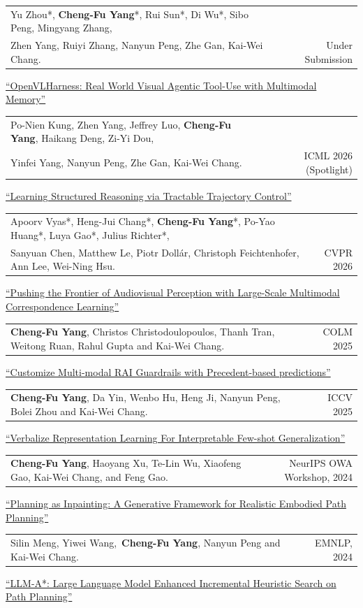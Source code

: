 \documentclass[letterpaper,11pt]{article}
\makeatletter
\newcommand{\resumePublicationHeading}[3]{
    \item
    \begin{tabular*}{0.97\textwidth}{l@{\extracolsep{\fill}}r}
      \small #1 & \small #2 \\
    \end{tabular*}\vspace{-7pt}

    \vspace{3pt}
    \small \hspace*{0.05in} #3
    \vspace{-4pt}
}
\makeatother
\begin{document}
      \resumePublicationHeading{Yu Zhou*, \textbf{Cheng-Fu Yang}*, Rui Sun*, Di Wu*, Sibo Peng, Mingyang Zhang, \\ Zhen Yang, Ruiyi Zhang, Nanyun Peng, Zhe Gan, Kai-Wei Chang.}{Under Submission}{\href{https://arxiv.org/abs/2610.26860}{``OpenVLHarness: Real World Visual Agentic Tool-Use with Multimodal Memory''}}

      \resumePublicationHeading{Po-Nien Kung, Zhen Yang, Jeffrey Luo, \textbf{Cheng-Fu Yang}, Haikang Deng, Zi-Yi Dou, \\
      \hspace*{0.05in} Yinfei Yang, Nanyun Peng, Zhe Gan, Kai-Wei Chang.}{ICML 2026 ({Spotlight})}{\href{https://proceedings.mlr.press/v306/kung26a.html}{``Learning Structured Reasoning via Tractable Trajectory Control''}}

     \resumePublicationHeading{Apoorv Vyas*, Heng-Jui Chang*, \textbf{Cheng-Fu Yang}*, Po-Yao Huang*, Luya Gao*, Julius Richter*, \\
      \hspace*{0.05in} Sanyuan Chen, Matthew Le, Piotr Dollár, Christoph Feichtenhofer, Ann Lee, Wei-Ning Hsu.}{CVPR 2026}{\href{https://openaccess.thecvf.com/content/CVPR2026/html/Vyas_Pushing_the_Frontier_of_Audiovisual_Perception_with_Large-Scale_Multimodal_Correspondence_CVPR_2026_paper.html}{``Pushing the Frontier of Audiovisual Perception with Large-Scale Multimodal Correspondence Learning''}}

     \resumePublicationHeading{\textbf{Cheng-Fu Yang}, Christos Christodoulopoulos, Thanh Tran, Weitong Ruan, Rahul Gupta and Kai-Wei Chang.}{COLM 2025}{\href{https://arxiv.org/abs/2507.20503}{``Customize Multi-modal RAI Guardrails with Precedent-based predictions''}}

     \resumePublicationHeading{\textbf{Cheng-Fu Yang}, Da Yin, Wenbo Hu, Heng Ji, Nanyun Peng, Bolei Zhou and Kai-Wei Chang. }{ICCV 2025}{\href{https://openaccess.thecvf.com/content/ICCV2025/papers/Yang_Verbalized_Representation_Learning_for_Interpretable_Few-Shot_Generalization_ICCV_2025_paper.pdf}{``Verbalize Representation Learning For Interpretable Few-shot Generalization''}}

      \resumePublicationHeading{\textbf{Cheng-Fu Yang}, Haoyang Xu, Te-Lin Wu, Xiaofeng Gao, Kai-Wei Chang, and Feng Gao. }{NeurIPS OWA Workshop, 2024}{\href{https://arxiv.org/abs/2312.01097}{``Planning as Inpainting: A Generative Framework for Realistic Embodied Path Planning''}}

      \resumePublicationHeading{Silin Meng, Yiwei Wang,~\textbf{Cheng-Fu Yang}, Nanyun Peng and Kai-Wei Chang.}{EMNLP, 2024}{\href{https://aclanthology.org/2024.findings-emnlp.60/}{``LLM-A*: Large Language Model Enhanced Incremental Heuristic Search on Path Planning''}}
\end{document}
